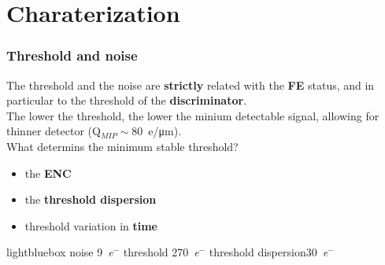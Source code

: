 \section{Charaterization}
    \begin{frame}
        \frametitle{Threshold and noise}
        The threshold and the noise are \textbf{strictly} related with the \textbf{FE} status, and in particular to the threshold of the \textbf{discriminator}.\\
        \medskip
        The lower the threshold, the lower the minium detectable signal, allowing for thinner detector (Q$_{MIP}\sim$\SI{80}{e/\um}). \\
        \medskip
        What determins the minimum stable threshold?
        \begin{itemize}
            \item the \textbf{ENC} 
            \item the \textbf{threshold dispersion} 
            \item threshold variation in \textbf{time}
        \end{itemize}
        \medskip
        \centering\begin{beamercolorbox}[sep=0em,wd=0.85\textwidth,ht=1.5ex, dp=0.1ex, rounded=true, center]{lightbluebox}
            noise \SI{9}{\elementarycharge}$^-$    threshold \SI{270}{\elementarycharge}$^-$    threshold dispersion\SI{30}{\elementarycharge}$^-$
        \end{beamercolorbox}
    \end{frame}


